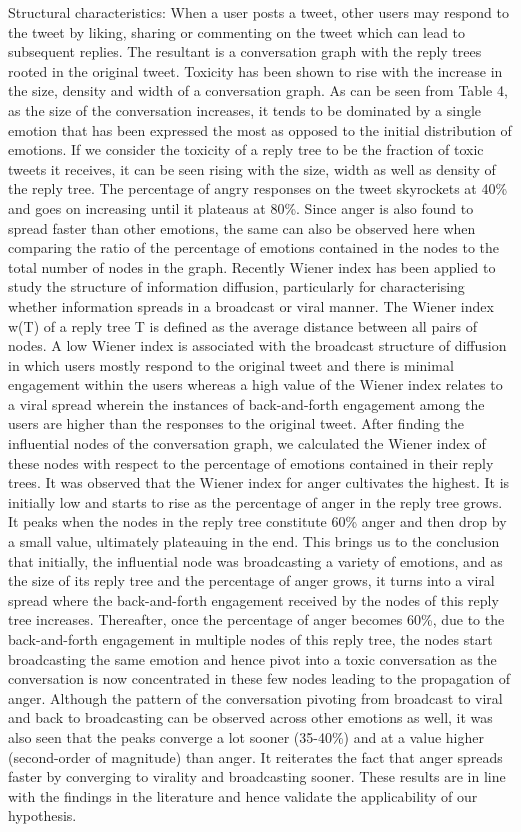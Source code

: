 \documentclass[acmtog]{acmart}
\begin{document}
Structural characteristics: When a user posts a tweet, other users may respond to the tweet by liking, sharing or commenting on the tweet which can lead to subsequent replies. The resultant is a conversation graph with the reply trees rooted in the original tweet. Toxicity has been shown to rise with the increase in the size, density and width of a conversation graph. As can be seen from Table 4, as the size of the conversation increases, it tends to be dominated by a single emotion that has been expressed the most as opposed to the initial distribution of emotions. If we consider the toxicity of a reply tree to be the fraction of toxic tweets it receives, it can be seen rising with the size, width as well as density of the reply tree. The percentage of angry responses on the tweet skyrockets at 40\% and goes on increasing until it plateaus at 80\%. Since anger is also found to spread faster than other emotions, the same can also be observed here when comparing the ratio of the percentage of emotions contained in the nodes to the total number of nodes in the graph. Recently Wiener index has been applied to study the structure of information diffusion, particularly for characterising whether information spreads in a broadcast or viral manner. The Wiener index w(T) of a reply tree T is defined as the average distance between all pairs of nodes. A low Wiener index is associated with the broadcast structure of diffusion in which users mostly respond to the original tweet and there is minimal engagement within the users whereas a high value of the Wiener index relates to a viral spread wherein the instances of back-and-forth engagement among the users are higher than the responses to the original tweet. After finding the influential nodes of the conversation graph, we calculated the Wiener index of these nodes with respect to the percentage of emotions contained in their reply trees. It was observed that the Wiener index for anger cultivates the highest. It is initially low and starts to rise as the percentage of anger in the reply tree grows. It peaks when the nodes in the reply tree constitute 60\% anger and then drop by a small value, ultimately plateauing in the end. This brings us to the conclusion that initially, the influential node was broadcasting a variety of emotions, and as the size of its reply tree and the percentage of anger grows, it turns into a viral spread where the back-and-forth engagement received by the nodes of this reply tree increases. Thereafter, once the percentage of anger becomes 60\%, due to the back-and-forth engagement in multiple nodes of this reply tree, the nodes start broadcasting the same emotion and hence pivot into a toxic conversation as the conversation is now concentrated in these few nodes leading to the propagation of anger. Although the pattern of the conversation pivoting from broadcast to viral and back to broadcasting can be observed across other emotions as well, it was also seen that the peaks converge a lot sooner (35-40\%) and at a value higher (second-order of magnitude) than anger. It reiterates the fact that anger spreads faster by converging to virality and broadcasting sooner. These results are in line with the findings in the literature and hence validate the applicability of our hypothesis.
\end{document}
